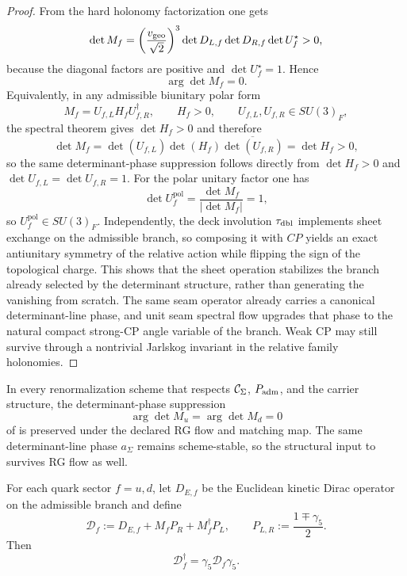 \begin{proof}
From the hard holonomy factorization one gets
\[
\det M_f
=
\left(\frac{v_{\mathrm{geo}}}{\sqrt2}\right)^3
\det D_{L,f}\det D_{R,f}\det U_f^\star
>
0,
\]
because the diagonal factors are positive and $\det U_f^\star=1$. Hence
\[
\arg\det M_f=0.
\]
Equivalently, in any admissible biunitary polar form
\[
M_f=U_{f,L}H_fU_{f,R}^\dagger,
\qquad
H_f>0,
\qquad
U_{f,L},U_{f,R}\in SU(3)_F,
\]
the spectral theorem gives $\det H_f>0$ and therefore
\[
\det M_f=\det(U_{f,L})\det(H_f)\overline{\det(U_{f,R})}=\det H_f>0,
\]
so the same determinant-phase suppression follows directly from $\det H_f>0$ and
$\det U_{f,L}=\det U_{f,R}=1$.
For the polar unitary factor one has
\[
\det U_f^{\mathrm{pol}}
=
\frac{\det M_f}{|\det M_f|}
=
1,
\]
so $U_f^{\mathrm{pol}}\in SU(3)_F$. Independently, the deck involution $\tau_{\mathrm{dbl}}$
implements sheet exchange on the admissible branch, so composing it with $CP$ yields an exact
antiunitary symmetry of the relative action while flipping the sign of the topological charge.
This shows that the sheet operation stabilizes the branch already selected by the determinant
structure, rather than generating the vanishing from scratch. The same seam operator already
carries a canonical determinant-line phase, and unit seam spectral flow upgrades that phase to the
natural compact strong-CP angle variable of the branch. Weak CP may still survive through a
nontrivial Jarlskog invariant in the relative family holonomies.
\end{proof}

\begin{corollary}
\label{cor:strong-cp-rg-stability}
In every renormalization scheme that respects $\mathcal C_{\Sigma}$, $P_{\mathrm{adm}}$, and the carrier structure, the
determinant-phase suppression
\[
\arg\det M_u=\arg\det M_d=0
\]
of  is preserved under the declared RG flow and matching map.
The same determinant-line phase $a_\Sigma$ remains scheme-stable, so the structural input to
 survives RG flow as well.
\end{corollary}

\begin{lemma}
\label{lem:retained-gamma5-hermiticity}
For each quark sector $f=u,d$, let $D_{E,f}$ be the Euclidean kinetic Dirac operator on the
admissible branch and define
\[
\mathcal D_f:=D_{E,f}+M_fP_R+M_f^\dagger P_L,
\qquad
P_{L,R}:=\frac{1\mp\gamma_5}{2}.
\]
Then
\[
\mathcal D_f^\dagger=\gamma_5\mathcal D_f\gamma_5.
\]
\end{lemma}

